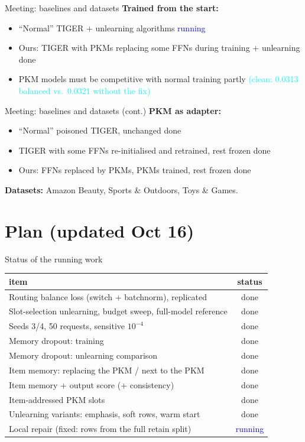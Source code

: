 \documentclass{beamer}
\newcommand{\pierre}[1]{\textcolor{cyan}{#1}}
\newcommand{\stdone}{\textcolor{green!50!black}{done}}
\newcommand{\strun}{\textcolor{blue}{running}}
\begin{document}
\begin{frame}{Meeting: baselines and datasets}
\textbf{Trained from the start:}
\begin{itemize}
  \item ``Normal'' TIGER $+$ unlearning algorithms \hfill \strun
  \item Ours: TIGER with PKMs replacing some FFNs during training $+$
        unlearning \hfill \stdone
  \item PKM models must be competitive with normal training \hfill partly
        \pierre{(clean: 0.0313 balanced vs.\ 0.0321 without the fix)}
\end{itemize}

\end{frame}

\begin{frame}{Meeting: baselines and datasets (cont.)}
\textbf{PKM as adapter:}
\begin{itemize}
  \item ``Normal'' poisoned TIGER, unchanged \hfill \stdone
  \item TIGER with some FFNs re-initialised and retrained, rest frozen \hfill \stdone
  \item Ours: FFNs replaced by PKMs, PKMs trained, rest frozen \hfill \stdone
\end{itemize}

\medskip
\textbf{Datasets:} Amazon Beauty, Sports \& Outdoors, Toys \& Games.
\end{frame}

\section{Plan (updated Oct 16)}

\begin{frame}{Status of the running work}
\begin{center}
\small
\begin{tabular}{|l|c|}
\hline
item & status \\
\hline
Routing balance loss (switch + batchnorm), replicated & \stdone \\
Slot-selection unlearning, budget sweep, full-model reference & \stdone \\
Seeds 3/4, 50 requests, sensitive $10^{-4}$ & \stdone \\
Memory dropout: training & \stdone \\
Memory dropout: unlearning comparison & \stdone \\
Item memory: replacing the PKM / next to the PKM & \stdone \\
Item memory + output score (+ consistency) & \stdone \\
Item-addressed PKM slots & \stdone \\
Unlearning variants: emphasis, soft rows, warm start & \stdone \\
Local repair (fixed: rows from the full retain split) & \strun \\
\hline
\end{tabular}
\end{center}
\end{frame}
\end{document}
